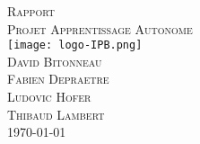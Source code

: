 \documentclass[a4paper, 11pt]{article}
\begin{document}
\begin{titlepage}
\begin{center}
\textsc{\huge Rapport}\\[3cm]
\textsc{\Huge Projet Apprentissage Autonome}\\[3cm]
\texttt{[image: logo-IPB.png]}\\[3cm]
\textsc{\Large David Bitonneau}\\
\textsc{\Large Fabien Depraetre}\\
\textsc{\Large Ludovic Hofer}\\
\textsc{\Large Thibaud Lambert}\\[3cm]
\textsc{\Large \today}\\
\end{center}
\end{titlepage}

\clearpage
\tableofcontents
\clearpage



\end{document}
